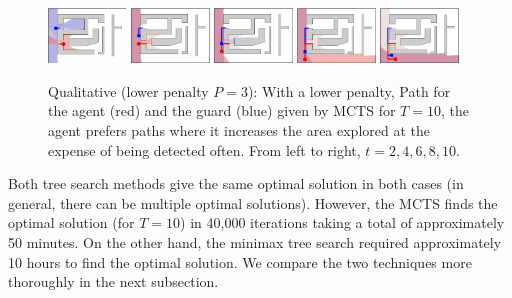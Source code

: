 \documentclass[10 pt, conference]{ieeeconf}
\newcommand{\PT}[1]{{\footnotesize\color{blue}[{\bf PT:} \textsf{#1}]}} %
\begin{document}
\begin{figure}[thb]
\centering
\includegraphics[width=0.185\textwidth]{figs/Low2.png}
\includegraphics[width=0.185\textwidth]{figs/Low4.png}
\includegraphics[width=0.185\textwidth]{figs/Low6.png}
\includegraphics[width=0.185\textwidth]{figs/Low8.png}
\includegraphics[width=0.185\textwidth]{figs/Low10.png}
\caption{Qualitative (lower penalty $P=3$):  With a lower penalty, Path for the agent (red) and the guard (blue) given by MCTS for $T=10$, the agent prefers paths where it increases the area explored at the expense of being detected often. From left to right, $t=2,4,6,8,10$.
}
\label{Low_minimax}         
\end{figure}

Both tree search methods give the same optimal solution in both cases (in general, there can be multiple optimal solutions). However, the MCTS finds the optimal solution (for $T=10$) in 40,000 iterations taking a total of approximately 50 minutes. On the other hand, the minimax tree search required approximately 10 hours to find the optimal solution. We compare the two techniques more thoroughly in the next subsection.
\end{document}
